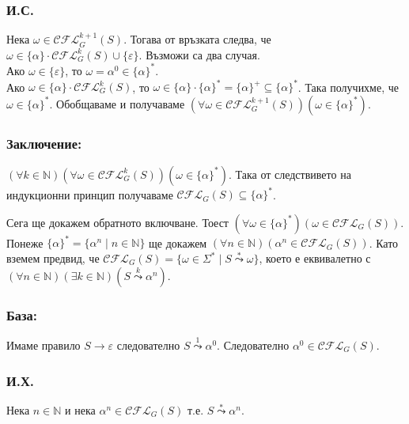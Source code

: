 \documentclass[12pt]{article}
\begin{document}
\subsubsection*{И.С.}
Нека \(\omega \in \mathcal{CFL}_G^{k + 1}(S)\). Тогава от връзката следва, че \\
\(\omega \in \{\alpha\} \cdot \mathcal{CFL}_G^k(S) \cup \{\varepsilon\}\).
Възможи са два случая. \\
Ако \(\omega \in \{\varepsilon\}\), то \(\omega = \alpha^0 \in \{\alpha\}^*\). \\
Ако \(\omega \in \{\alpha\} \cdot \mathcal{CFL}_G^k(S)\), то \(\omega \in \{\alpha\} \cdot \{\alpha\}^* = \{\alpha\}^+ \subseteq \{\alpha\}^*\).
Така получихме, че \(\omega \in \{\alpha\}^*\).
Обобщаваме и получаваме \((\forall \omega \in \mathcal{CFL}_G^{k + 1}(S))(\omega \in \{\alpha\}^*)\).

\subsubsection*{Заключение:}
\((\forall k \in \mathbb N)(\forall \omega \in \mathcal{CFL}_G^k(S))(\omega \in \{\alpha\}^*  )\).
Така от следствивето на индукционни принцип получаваме \(\mathcal{CFL}_G(S) \subseteq \{\alpha\}^*\).

\vspace*{5mm}

\par Сега ще докажем обратното включване. Тоест \((\forall \omega \in \{\alpha\}^*)(\omega \in \mathcal{CFL}_G(S))\).
Понеже \(\{\alpha\}^* = \{\alpha^n \mid n \in \mathbb N\}\) ще докажем 
\((\forall n \in \mathbb N)(\alpha^n \in \mathcal{CFL}_G(S))\).
Като вземем предвид, че \(\mathcal{CFL}_G(S) = \{\omega \in \Sigma^* \mid S \overset{*}{\leadsto} \omega \}\),
което е еквивалетно с \((\forall n \in \mathbb N)(\exists k \in \mathbb N)(S \overset{k}{\leadsto} \alpha^n)\).

\subsubsection*{База:}
Имаме правило \(S \to \varepsilon\) следователно \(S \overset{1}{\leadsto} \alpha^0\).
Следователно \(\alpha^0 \in \mathcal{CFL}_G(S)\).

\subsubsection*{И.Х.}
Нека \(n \in \mathbb N\) и нека \(\alpha^n \in \mathcal{CFL}_G(S)\) т.е. \(S \overset{*}{\leadsto} \alpha^n \).
\end{document}

